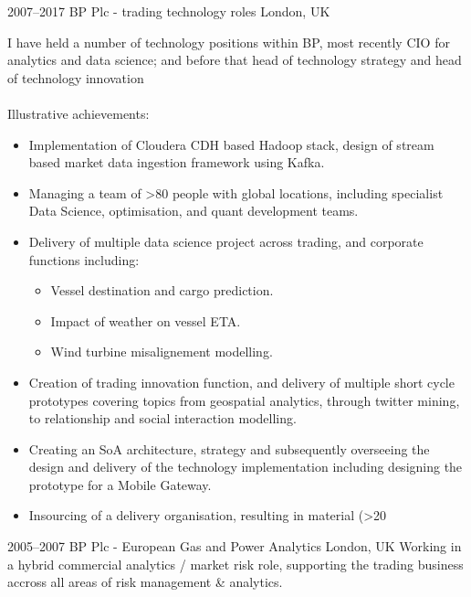 \documentclass[]{friggeri-cv-a4}
\begin{document}
\begin{entrylist}


\entry
{2007--2017}
{BP Plc - trading technology roles}
{London, UK}
{
I have held a number of technology positions within BP, most recently CIO for analytics and data science; and before that head of technology strategy and head of technology innovation \\ \\
Illustrative achievements:
\begin{itemize}
	\item Implementation of Cloudera CDH based Hadoop stack, design of stream based market data ingestion framework using Kafka.
	\item Managing a team of >80 people with global locations, including specialist Data Science, optimisation, and quant development teams.
	\item Delivery of multiple data science project across trading, and corporate functions including:
	\begin{itemize}
		\item Vessel destination and cargo prediction.
		\item Impact of weather on vessel ETA.
		\item Wind turbine misalignement modelling.
	\end{itemize}
	\item Creation of trading innovation function, and delivery of multiple short cycle prototypes covering topics from geospatial analytics, through twitter mining, to relationship and social interaction modelling.
	\item Creating an SoA architecture, strategy and subsequently overseeing the design and delivery of the technology implementation including designing the prototype for a Mobile Gateway.
	\item Insourcing of a delivery organisation, resulting in material (>20%
\end{itemize}
}


\entry
{2005--2007}
{BP Plc - European Gas and Power Analytics}
{London, UK}
{
Working in a hybrid commercial analytics / market risk role, supporting the trading business accross all areas of risk management \& analytics.  \\

}
\end{entrylist}
\end{document}
